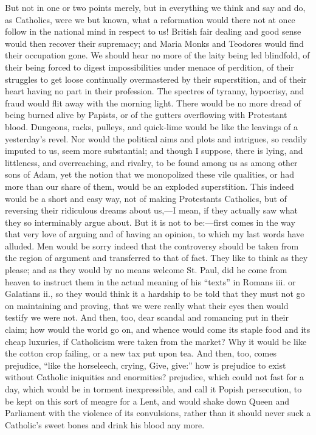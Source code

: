 But not in one or two points merely, but in everything
we think and say and do, as Catholics, were we but known,
what a reformation would there not at once follow in the
national mind in respect to us! British fair dealing and
good sense would then recover their supremacy; and Maria
Monks and Teodores would find their occupation gone. We
should hear no more of the laity being led blindfold, of
their being forced to digest impossibilities under menace
of perdition, of their struggles to get loose continually
overmastered by their superstition, and of their heart
having no part in their profession. The spectres of
tyranny, hypocrisy, and fraud would flit away with the
morning light. There would be no more dread of being
burned alive by Papists, or of the gutters overflowing
with Protestant blood. Dungeons, racks, pulleys, and
quick-lime would be like the leavings of a yesterday's
revel. Nor would the political aims and plots and
intrigues, so readily imputed to us, seem more
substantial; and though I suppose, there is lying, and
littleness, and overreaching, and rivalry, to be found
among us as among other sons of Adam, yet the notion that
we monopolized these vile qualities, or had more than our
share of them, would be an exploded superstition. This
indeed would be a short and easy way, not of making
Protestants Catholics, but of reversing their ridiculous
dreams about us,—I mean, if they actually saw what they
so interminably argue about. But it is not to be:—first
comes in the way that very love of arguing and of having
an opinion, to which my last words have alluded. Men
would be sorry indeed that the controversy should be
taken from the region of argument and transferred to that
of fact. They like to think as they please; and as they
would by no means welcome St. Paul, did he come from
heaven to instruct them in the actual meaning of his
``texts'' in Romans iii. or Galatians ii., so
they would think it a hardship to be told that they must
not go on maintaining and proving, that we were really
what their eyes then would testify we were not. And then,
too, dear scandal and romancing put in their claim; how
would the world go on, and whence would come its staple
food and its cheap luxuries, if Catholicism were taken
from the market? Why it would be like the cotton crop
failing, or a new tax put upon tea. And then, too, comes
prejudice, ``like the horseleech, crying, Give,
give:'' how is prejudice to exist without Catholic
iniquities and enormities? prejudice, which could not
fast for a day, which would be in torment inexpressible,
and call it Popish persecution, to be kept on this sort
of meagre for a Lent, and would shake down Queen and
Parliament with the violence of its convulsions, rather
than it should never suck a Catholic's sweet bones and
drink his blood any more.


